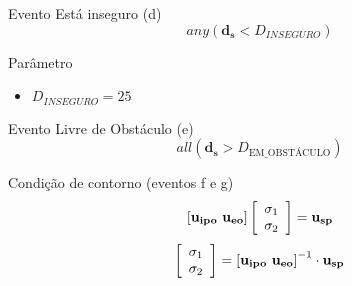 \begin{frame}
	\begin{exampleblock}{Evento Está inseguro (d)}
		\begin{equation}
			any(\mathbf{d_s} < D_{INSEGURO})
		\end{equation}
	\end{exampleblock}
	\pause
	\begin{block}{Parâmetro}
		\begin{itemize}
		  \item $D_{INSEGURO} = 25$
		\end{itemize}
	\end{block}
\end{frame}

\begin{frame}
	\begin{block}{Evento Livre de Obstáculo (e)}
		\begin{equation}
			all(\mathbf{d_s} > D_{\text{EM\_OBSTÁCULO}})
		\end{equation}
	\end{block}
\end{frame}

\begin{frame}
	\begin{exampleblock}{Condição de contorno (eventos f e g)}
		\begin{equation}
			\left[\mathbf{u_{ipo}} \ \mathbf{u_{eo}}\right] 
			\mleft[ 
			\begin{array}{c c}
			\sigma_1 \\ \sigma_2
			\end{array}
			\mright]
			= \mathbf{u_{sp}}
		\end{equation}
		\begin{equation}
			\mleft[ 
			\begin{array}{c c}
			\sigma_1 \\ \sigma_2
			\end{array}
			\mright] = \left[\mathbf{u_{ipo}} \ \mathbf{u_{eo}}\right]^{-1} \cdot \mathbf{u_{sp}}
		\end{equation}
	\end{exampleblock}
\end{frame}

